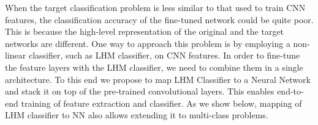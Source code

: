 \documentclass[twoside,11pt]{article}
\begin{document}

When the target classification problem is less similar to that used to train CNN features, the classification accuracy of the fine-tuned network could be quite poor. This is because the high-level representation of the original and the target networks are different. One way to approach this problem is by employing a non-linear classifier, such as LHM classifier, on  CNN features. In order to fine-tune the feature layers with the LHM classifier, we need to combine them in a single architecture. To this end we  propose to map LHM Classifier to a Neural Network and stack it on top of the pre-trained convolutional layers. This enables end-to-end training of feature extraction and classifier.
As we show below, mapping of LHM classifier to NN also allows extending it to multi-class problems.
\end{document}

